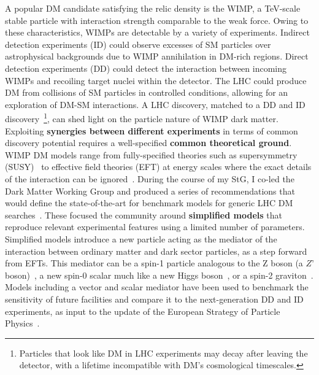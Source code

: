 A popular DM candidate satisfying the relic density is the WIMP, a TeV-scale stable particle with interaction strength comparable to the weak force.  
Owing to these characteristics, WIMPs are detectable by a variety of experiments. 
Indirect detection experiments (ID) could observe excesses of SM particles over astrophysical backgrounds due to WIMP annihilation in DM-rich regions. 
Direct detection experiments (DD) could detect the interaction between incoming WIMPs and recoiling target nuclei within the detector. 
The LHC could produce DM from collisions of SM particles in controlled conditions, allowing for an exploration of DM-SM interactions. 
A LHC discovery, matched to a DD and ID discovery~\footnote{Particles that look like DM in LHC experiments may decay after leaving the detector, with a lifetime incompatible with DM’s cosmological timescales.}, can shed light on the particle nature of WIMP dark matter. 
\\
\indent 
Exploiting \textbf{synergies between different experiments} in terms of common discovery potential requires a well-specified \textbf{common theoretical ground}. 
WIMP DM models range from fully-specified theories such as supersymmetry (SUSY)~\cite{Martin:1997ns} to effective field theories (EFT) at energy scales where the exact details of the interaction can be ignored~\cite{Goodman:2010ku}. 
During the course of my StG, I co-led the Dark Matter Working Group and produced a series of recommendations that would define the state-of-the-art for benchmark models for generic LHC DM searches~\cite{Abercrombie:2015wmb}. 
These focused the community around \textbf{simplified models} that reproduce relevant experimental features using a limited number of parameters. 
Simplified models introduce a new particle acting as the mediator of the interaction between ordinary matter and dark sector particles, as a step forward from EFTs. 
This mediator can be a spin-1 particle analogous to the Z boson (a $Z’$ boson)~\cite{Shoemaker:2011vi,Buchmueller:2013dya,Chala:2015ama}, a new spin-0 scalar much like a new Higgs boson~\cite{Buckley:2014fba,Egana-Ugrinovic:2019dqu,Abe:2018bpo}, or a spin-2 graviton~\cite{Kang:2020huh}. 
Models including a vector and scalar mediator have been used to benchmark the sensitivity of future facilities and compare it to the next-generation DD and ID experiments, as input to the update of the European Strategy of Particle Physics~\cite{Strategy:2019vxc}.
